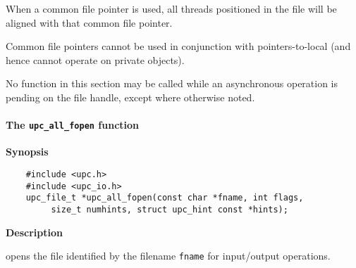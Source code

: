 \np When a common file pointer is used, all threads positioned in the file
will be aligned with that common file pointer.

\np Common file pointers cannot be used in conjunction with pointers-to-local 
(and hence cannot operate on private objects).

\np No function in this section may be called while an asynchronous
operation is pending on the file handle, except where otherwise noted.

\paragraph{The {\tt upc\_all\_fopen} function}
\label{io-func-open}

{\bf Synopsis}

\npf\vspace{-2.5em}
 \begin{verbatim}
    #include <upc.h>
    #include <upc_io.h>
    upc_file_t *upc_all_fopen(const char *fname, int flags, 
         size_t numhints, struct upc_hint const *hints);
\end{verbatim}

{\bf Description}

 opens the file identified by the filename {\tt fname} for
input/output operations.

